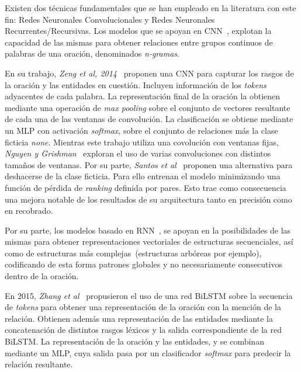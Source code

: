 Existen dos técnicas fundamentales que se han empleado en la literatura con este fin: Redes Neuronales Convolucionales y Redes Neuronales Recurrentes/Recursivas.
Los modelos que se apoyan en CNN~\cite{zeng2014relation, santos2015classifying, nguyen2015relation, xu2015semantic, huang2016attention, wang2016relation}, explotan la capacidad de las mismas para obtener relaciones entre grupos continuos de palabras de una oración, denominados \textit{n-gramas}.

En su trabajo, \textit{Zeng et al, 2014}~\cite{zeng2014relation} proponen una CNN para capturar los rasgos de la oración y las entidades en cuestión.
Incluyen información de los \textit{tokens} adyacentes de cada palabra.
La representación final de la oración la obtienen mediante una operación de \textit{max pooling} sobre el conjunto de vectores resultante de cada una de las ventanas de convolución.
La clasificación se obtiene mediante un MLP con activación \textit{softmax}, sobre el conjunto de relaciones más la clase ficticia \textit{none}.
Mientras este trabajo utiliza una covolución con ventanas fijas, \textit{Nguyen y Grishman}~\cite{nguyen2015relation} exploran el uso de varias convoluciones con distintos tamaños de ventanas.
Por su parte, \textit{Santos et al}~\cite{santos2015classifying} proponen una alternativa para deshacerse de la clase ficticia.
Para ello entrenan el modelo minimizando una función de pérdida de \textit{ranking} definida por pares.
Esto trae como consecuencia una mejora notable de los resultados de su arquitectura tanto en precisión como en recobrado.

Por su parte, los modelos basado en RNN~\cite{socher2012semantic, xu2015classifying, zhang2015bidirectional, ebrahimi2015chain, xiao2016semantic, lee2019semantic}, se apoyan en la posibilidades de las mismas para obtener representaciones vectoriales de estructuras secuenciales, así como de estructuras más complejas~(estructuras arbóreas por ejemplo), codificando de esta forma patrones globales y no necesariamente consecutivos dentro de la oración.

En 2015, \textit{Zhang et al}~\cite{zhang2015bidirectional} propusieron el uso de una red BiLSTM sobre la secuencia de \textit{tokens} para obtener una representación de la oración con la mención de la relación.
Obtienen además una representación de las entidades mediante la concatenación de distintos rasgos léxicos y la salida correspondiente de la red BiLSTM.
La representación de la oración y las entidades, y se combinan mediante un MLP, cuya salida pasa por un clasificador \textit{softmax} para predecir la relación resultante.

